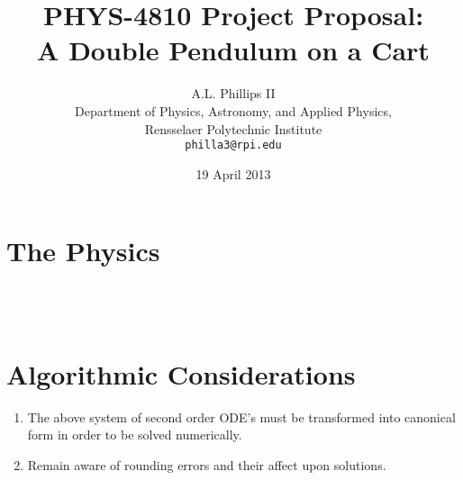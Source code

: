 \documentclass{report}
\begin{document}
\title{\textbf{PHYS-4810 Project Proposal:} 
\\A Double Pendulum on a Cart}
\author{A.L. Phillips II\\
  Department of Physics, Astronomy, and Applied Physics,\\
  Rensselaer Polytechnic Institute\\
  \texttt{philla3@rpi.edu}}
 \date{19 April 2013}
 \renewcommand{\chaptername}{Assignment}
 \setcounter {chapter}{2}
\maketitle
\section*{The Physics}



\\
\\

\section*{Algorithmic Considerations}

\begin{enumerate}

\item The above system of second order ODE's must be transformed into canonical form in order to be solved numerically.   

\item Remain aware of rounding errors and their affect upon solutions.

\end{enumerate}

\\
\\
\end{document}
